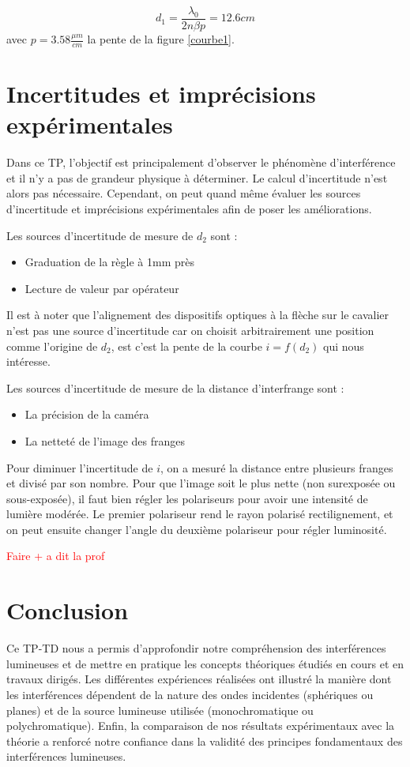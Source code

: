 \documentclass[11pt, a4paper]{article}
\begin{document}
$$
    d_1 =  \frac{\lambda_0}{2n\beta p} = 12.6 cm
$$
avec $p=3.58 \frac{\mu m}{cm}$ la pente de la figure \ref{courbe1}.

\section{Incertitudes et imprécisions expérimentales}
Dans ce TP, l'objectif est principalement d'observer le phénomène d'interférence et il n'y a pas de grandeur physique à déterminer. Le calcul d'incertitude n'est alors pas nécessaire. Cependant, on peut quand même évaluer les sources d'incertitude et imprécisions expérimentales afin de poser les améliorations.

Les sources d'incertitude de mesure de $d_2$ sont :
\begin{itemize}
    \item Graduation de la règle à 1mm près
    \item Lecture de valeur par opérateur
\end{itemize}

Il est à noter que l'alignement des dispositifs optiques à la flèche sur le cavalier n'est pas une source d'incertitude car on choisit arbitrairement une position comme l'origine de $d_2$, est c'est la pente de la courbe $i=f(d_2)$ qui nous intéresse.

Les sources d'incertitude de mesure de la distance d'interfrange sont :
\begin{itemize}
    \item La précision de la caméra
    \item La netteté de l'image des franges
\end{itemize}

Pour diminuer l'incertitude de $i$, on a mesuré la distance entre plusieurs franges et divisé par son nombre. Pour que l'image soit le plus nette (non surexposée ou sous-exposée), il faut bien régler les polariseurs pour avoir une intensité de lumière modérée. Le premier polariseur rend le rayon polarisé rectilignement, et on peut ensuite changer l'angle du deuxième polariseur pour régler luminosité.

\textcolor{red}{Faire + a dit la prof}

\section{Conclusion}
Ce TP-TD nous a permis d'approfondir notre compréhension des interférences lumineuses et de mettre en pratique les concepts théoriques étudiés en cours et en travaux dirigés. Les différentes expériences réalisées ont illustré la manière dont les interférences dépendent de la nature des ondes incidentes (sphériques ou planes) et de la source lumineuse utilisée (monochromatique ou polychromatique). Enfin, la comparaison de nos résultats expérimentaux avec la théorie a renforcé notre confiance dans la validité des principes fondamentaux des interférences lumineuses.
\end{document}
